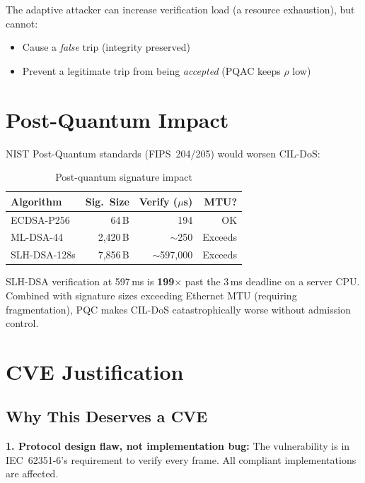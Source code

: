 \documentclass[11pt,a4paper,twocolumn]{article}
\begin{document}
The adaptive attacker can increase verification load (a resource exhaustion), but cannot:
\begin{itemize}[leftmargin=1.5em,itemsep=1pt]
\item Cause a \emph{false} trip (integrity preserved)
\item Prevent a legitimate trip from being \emph{accepted} (PQAC keeps $\rho$ low)
\end{itemize}

\section{Post-Quantum Impact}
\label{sec:pqc}

NIST Post-Quantum standards (FIPS~204/205) would worsen CIL-DoS:

\begin{table}[H]
\centering
\caption{Post-quantum signature impact}
\scriptsize
\begin{tabular}{@{}lrrr@{}}
\toprule
\textbf{Algorithm} & \textbf{Sig.\ Size} & \textbf{Verify ($\mu$s)} & \textbf{MTU?} \\
\midrule
ECDSA-P256 & 64\,B & 194 & OK \\
ML-DSA-44 & 2{,}420\,B & $\sim$250 & Exceeds \\
SLH-DSA-128s & 7{,}856\,B & $\sim$597{,}000 & Exceeds \\
\bottomrule
\end{tabular}
\end{table}

SLH-DSA verification at 597\,ms is \textbf{199$\times$} past the 3\,ms deadline on a server CPU. Combined with signature sizes exceeding Ethernet MTU (requiring fragmentation), PQC makes CIL-DoS catastrophically worse without admission control.

\section{CVE Justification}
\label{sec:cve}

\subsection{Why This Deserves a CVE}

\textbf{1. Protocol design flaw, not implementation bug:} The vulnerability is in IEC~62351-6's requirement to verify every frame. All compliant implementations are affected.
\end{document}
